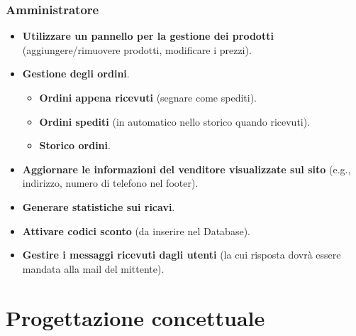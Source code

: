 \documentclass[a4paper,12pt]{report}
\begin{document}
	\subsection{Amministratore}
	\begin{itemize}
		\item \textbf{Utilizzare un pannello per la gestione dei prodotti} (aggiungere/rimuovere prodotti, modificare i prezzi).
		\item \textbf{Gestione degli ordini}.
		\begin{itemize}
			\item \textbf{Ordini appena ricevuti} (segnare come spediti).
			\item \textbf{Ordini spediti} (in automatico nello storico quando ricevuti).
			\item \textbf{Storico ordini}.
		\end{itemize}
		\item \textbf{Aggiornare le informazioni del venditore visualizzate sul sito} (e.g., indirizzo, numero di telefono nel footer).
		\item \textbf{Generare statistiche sui ricavi}.
		\item \textbf{Attivare codici sconto} (da inserire nel Database).
		\item \textbf{Gestire i messaggi ricevuti dagli utenti} (la cui risposta dovrà essere mandata alla mail del mittente).
	\end{itemize}
	
	\chapter{Progettazione concettuale}
\end{document}
